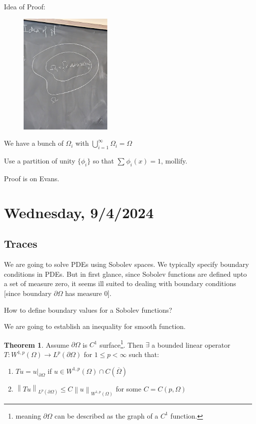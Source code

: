 \documentclass{article}
\theoremstyle{definition}
\newtheorem{theorem}{Theorem}
\begin{document}
Idea of Proof: 

\begin{figure}[H]
    \centering
    \includegraphics[width=0.4\textwidth]{img/PXL_20240830_161621740}
\end{figure}

We have a bunch of \(\Omega _i\) with \(\bigcup_{i=1}^{\infty} \Omega _i = \Omega\) 

Use a partition of unity \(\{ \phi_i \} \) so that \(\sum_{} \phi_i(x) = 1\), mollify.

Proof is on Evans.

\section*{Wednesday, 9/4/2024}

\subsection*{Traces}

We are going to solve PDEs using Sobolev spaces. We typically specify boundary conditions in PDEs. But in first glance, since Sobolev functions are defined upto a set of measure zero, it seems ill suited to dealing with boundary conditions [since boundary \(\partial \Omega\) has measure 0].

How to define boundary values for a Sobolev functions?

We are going to establish an inequality for smooth function.

\begin{theorem}
    Assume \(\partial \Omega\) is \(C^1\) surface\footnote{meaning \(\partial \Omega\) can be described as the graph of a \(C^1\) function.}. Then \(\exists\) a bounded linear operator \(T : W^{1,p}(\Omega) \to L^p(\partial \Omega)\) for \(1 \leq p < \infty\) such that:

    \begin{enumerate}[label=\roman*)]
        \item \(Tu = u |_{\partial \Omega}\) if \(u \in W^{1,p}(\Omega)\cap C(\overline{\Omega})\) 
        \item \(\left\lVert T u \right\rVert _{L^p(\partial \Omega)} \leq C \left\lVert u \right\rVert _{W^{1,p}(\Omega)}\) for some \(C= C(p, \Omega)\)   
    \end{enumerate} 
\end{theorem}
\end{document}
